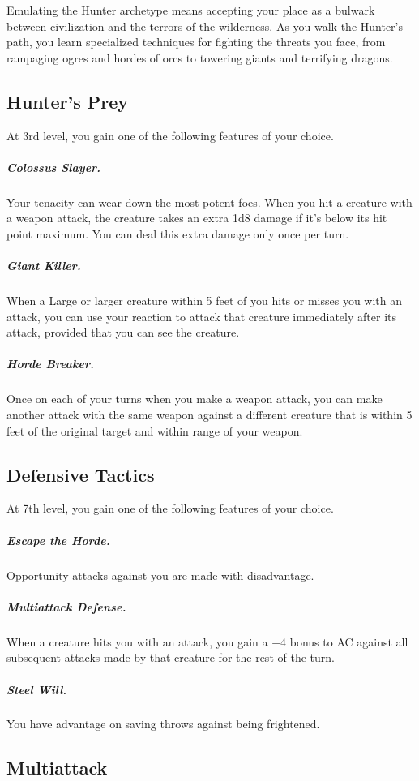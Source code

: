 Emulating the Hunter archetype means accepting your place as a bulwark between civilization and the terrors of the wilderness. As you walk the Hunter's path, you learn specialized techniques for fighting the threats you face, from rampaging ogres and hordes of orcs to towering giants and terrifying dragons.

\subsection{Hunter's Prey}

At 3rd level, you gain one of the following features of your choice.

\subparagraph*{Colossus Slayer.} Your tenacity can wear down the most potent foes. When you hit a creature with a weapon attack, the creature takes an extra 1d8 damage if it's below its hit point maximum. You can deal this extra damage only once per turn.

\subparagraph*{Giant Killer.} When a Large or larger creature within 5 feet of you hits or misses you with an attack, you can use your reaction to attack that creature immediately after its attack, provided that you can see the creature.

\subparagraph*{Horde Breaker.} Once on each of your turns when you make a weapon attack, you can make another attack with the same weapon against a different creature that is within 5 feet of the original target and within range of your weapon.

\subsection{Defensive Tactics}

At 7th level, you gain one of the following features of your choice.

\subparagraph*{Escape the Horde.} Opportunity attacks against you are made with disadvantage.

\subparagraph*{Multiattack Defense.} When a creature hits you with an attack, you gain a +4 bonus to AC against all subsequent attacks made by that creature for the rest of the turn.

\subparagraph*{Steel Will.} You have advantage on saving throws against being frightened.

\subsection{Multiattack}

